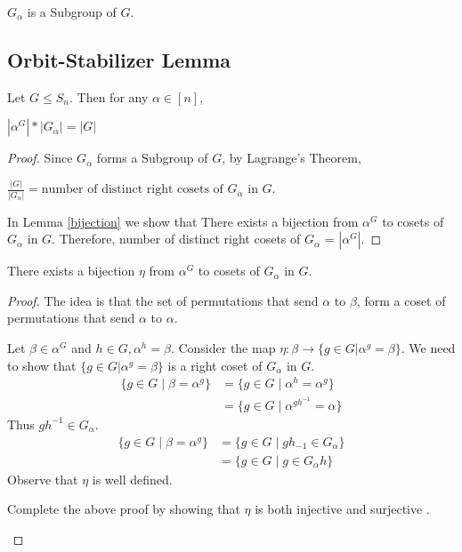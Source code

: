 \begin{observation}
$G_{\alpha}$ is a Subgroup of $G$.
\end{observation}

\subsection{Orbit-Stabilizer Lemma}
\begin{theorem}
Let $G\leq S_n$. Then for any $\alpha \in [n]$,
\begin{center}
$|\alpha^G|*|G_{\alpha}| = |G|$ 
\end{center}
\end{theorem}
\begin{proof}
Since $G_{\alpha}$ forms a Subgroup of $G$, by Lagrange's Theorem,
\begin{center}
$\frac{|G|}{|G_{\alpha}|} = \mbox{number of distinct right cosets of $G_\alpha$ in $G$}$. 
\end{center}
In Lemma \ref{bijection} we show that There exists a bijection from $\alpha^G$ to cosets of $G_{\alpha}$ in $G$. Therefore, number of distinct right cosets of $G_{\alpha}$ = $|\alpha^G|$. 
\end{proof}


\begin{lemma}
\label{bijection}
There exists a bijection $\eta$ from $\alpha^G$ to cosets of $G_{\alpha}$ in $G$.
\end{lemma}
\begin{proof}
The idea is that the set of permutations that send $\alpha$ to $\beta$, form a coset of permutations that send $\alpha$ to $\alpha$.

Let $\beta \in \alpha^G$ and $h \in G,\alpha^h = \beta$. Consider the map
$\eta : \beta \rightarrow \{g \in G| \alpha^g = \beta \} $. We need to show that  $\{g \in G| \alpha^g = \beta \} $ is a right coset of $G_\alpha$ in $G$.
\begin{align*}
\{g \in G\mid \beta = \alpha^g\} &= \{ g \in G \mid \alpha^h = \alpha^g \}\\
 &=  \{ g \in G \mid \alpha^{gh^{-1}} = \alpha\}
\end{align*}
Thus $gh^{-1} \in G_{\alpha}$.
\begin{align*}
\{g \in G\mid \beta = \alpha^g\}  &= \{ g \in G \mid gh_{-1} \in G_{\alpha} \}\\
 &=  \{ g \in G \mid g \in G_{\alpha}h \}
\end{align*}
Observe that $\eta$ is well defined.

\begin{exercise}
Complete the above proof by showing that $\eta$ is both injective and surjective .
\end{exercise}
\end{proof}




